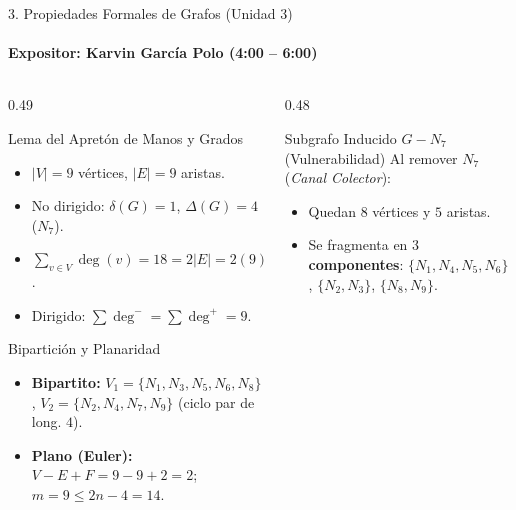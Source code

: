 \documentclass[aspectratio=169]{beamer}
\begin{document}
\begin{frame}{3. Propiedades Formales de Grafos (Unidad 3)}
    \framesubtitle{Expositor: Karvin García Polo (4:00 -- 6:00)}
    \begin{columns}[T]
        \begin{column}{0.49\textwidth}
            \footnotesize
            \begin{block}{Lema del Apretón de Manos y Grados}
                \begin{itemize}
                    \item $|V| = 9$ vértices, $|E| = 9$ aristas.
                    \item No dirigido: $\delta(G)=1$, $\Delta(G)=4$ ($N_7$).
                    \item $\sum_{v \in V}\deg(v) = 18 = 2|E| = 2(9)$.
                    \item Dirigido: $\sum \deg^- = \sum \deg^+ = 9$.
                \end{itemize}
            \end{block}
            \begin{block}{Bipartición y Planaridad}
                \begin{itemize}
                    \item \textbf{Bipartito:} $V_1=\{N_1,N_3,N_5,N_6,N_8\}$, $V_2=\{N_2,N_4,N_7,N_9\}$ (ciclo par de long. $4$).
                    \item \textbf{Plano (Euler):} $V - E + F = 9 - 9 + 2 = 2$; $m = 9 \le 2n - 4 = 14$.
                \end{itemize}
            \end{block}
        \end{column}
        \begin{column}{0.48\textwidth}
            \footnotesize
            \begin{alertblock}{Subgrafo Inducido $G - N_7$ (Vulnerabilidad)}
                Al remover $N_7$ (\textit{Canal Colector}):
                \begin{itemize}
                    \item Quedan $8$ vértices y $5$ aristas.
                    \item Se fragmenta en \textbf{$3$ componentes}: $\{N_1,N_4,N_5,N_6\}$, $\{N_2,N_3\}$, $\{N_8,N_9\}$.

\end{itemize}
\end{alertblock}
\end{column}
\end{columns}
\end{frame}
\end{document}
